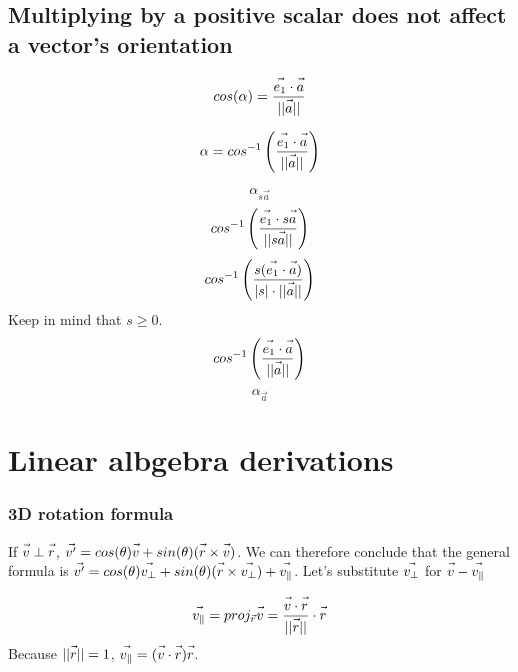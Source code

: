 \documentclass{article}
\newcommand{\fvec}[1]{\vec{\vphantom{A}#1}}
\begin{document}
\subsection{Multiplying by a positive scalar does not affect a vector's orientation}
\noindent\begin{minipage}{.5\linewidth}
$$ cos(\alpha) = \frac{\fvec{e_1} \cdot \fvec{a}}{||\fvec{a}||} $$
\end{minipage}%
\hfill
\begin{minipage}{.5\linewidth}
$$ \alpha = cos^{-1}\left(\frac{\fvec{e_1} \cdot \fvec{a}}{||\fvec{a}||}\right) $$
\end{minipage}%

$$ \alpha_{s\vec{a}} $$
$$ cos^{-1}\left(\frac{\fvec{e_1} \cdot s\fvec{a}}{||s\fvec{a}||}\right) $$
$$ cos^{-1}\left(\frac{s(\fvec{e_1} \cdot \fvec{a})}{|s| \cdot ||\fvec{a}||}\right) $$
Keep in mind that $ s \ge 0 $.
$$ cos^{-1}\left(\frac{\fvec{e_1} \cdot \fvec{a}}{||\fvec{a}||}\right) $$
$$ \alpha_{\vec{a}} $$

\section{Linear albgebra derivations}
\subsubsection{3D rotation formula}
If $ \fvec{v} \perp \fvec{r} $, $ \fvec{v^{\prime}} = cos(\theta) \fvec{v} + sin(\theta)(\fvec{r} \times \fvec{v}) $. We can therefore conclude that the general formula is $ \fvec{v^{\prime}} = cos(\theta) \fvec{v_{\perp}} + sin(\theta)(\fvec{r} \times \fvec{v_{\perp}}) + \fvec{v_{\parallel}} $. Let's substitute $ \fvec{v_{\perp}} $ for $ \fvec{v} - \fvec{v_{\parallel}} $

$$ \fvec{v_{\parallel}} = proj_{\vec{r}} \fvec{v} = \frac{\fvec{v} \cdot \fvec{r}}{||\fvec{r}||} \cdot \fvec{r} $$
Because $ ||\fvec{r}|| = 1 $, $ \fvec{v_{\parallel}} = (\fvec{v} \cdot \fvec{r}) \fvec{r} $.
\end{document}
